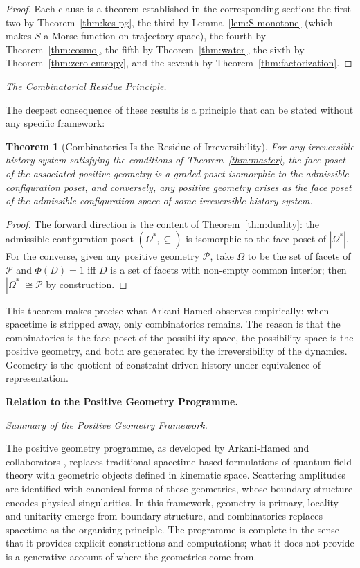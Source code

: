 \documentclass[11pt]{article}
\theoremstyle{plain}
\newtheorem{theorem}{Theorem}[section]
\theoremstyle{definition}
\theoremstyle{remark}
\newcommand{\Phif}{\Phi}
\newcommand{\Sf}{S}
\newcommand{\OmKS}{\Omega}
\begin{document}
\begin{proof}
Each clause is a theorem established in the corresponding section: the first two by Theorem~\ref{thm:kes-pg}, the third by Lemma~\ref{lem:S-monotone} (which makes $\Sf$ a Morse function on trajectory space), the fourth by Theorem~\ref{thm:cosmo}, the fifth by Theorem~\ref{thm:water}, the sixth by Theorem~\ref{thm:zero-entropy}, and the seventh by Theorem~\ref{thm:factorization}.
\end{proof}

\medskip\noindent\textit{The Combinatorial Residue Principle.}

The deepest consequence of these results is a principle that can be stated without any specific framework:

\begin{theorem}[Combinatorics Is the Residue of Irreversibility]
For any irreversible history system satisfying the conditions of Theorem~\ref{thm:master}, the face poset of the associated positive geometry is a graded poset isomorphic to the admissible configuration poset, and conversely, any positive geometry arises as the face poset of the admissible configuration space of some irreversible history system.
\end{theorem}

\begin{proof}
The forward direction is the content of Theorem~\ref{thm:duality}: the admissible configuration poset $(\OmKS^*, \subseteq)$ is isomorphic to the face poset of $|\OmKS^*|$. For the converse, given any positive geometry $\mathcal{P}$, take $\OmKS$ to be the set of facets of $\mathcal{P}$ and $\Phif(D) = 1$ iff $D$ is a set of facets with non-empty common interior; then $|\OmKS^*| \cong \mathcal{P}$ by construction.
\end{proof}

This theorem makes precise what Arkani-Hamed observes empirically: when spacetime is stripped away, only combinatorics remains. The reason is that the combinatorics is the face poset of the possibility space, the possibility space is the positive geometry, and both are generated by the irreversibility of the dynamics. Geometry is the quotient of constraint-driven history under equivalence of representation.

\bigskip\noindent\textbf{Relation to the Positive Geometry Programme.}
\label{sec:relation}

\medskip\noindent\textit{Summary of the Positive Geometry Framework.}

The positive geometry programme, as developed by Arkani-Hamed and collaborators \cite{ArkaniHamed2017, ArkaniHamed2014, ArkaniHamed2012}, replaces traditional spacetime-based formulations of quantum field theory with geometric objects defined in kinematic space. Scattering amplitudes are identified with canonical forms of these geometries, whose boundary structure encodes physical singularities. In this framework, geometry is primary, locality and unitarity emerge from boundary structure, and combinatorics replaces spacetime as the organising principle. The programme is complete in the sense that it provides explicit constructions and computations; what it does not provide is a generative account of where the geometries come from.
\end{document}
